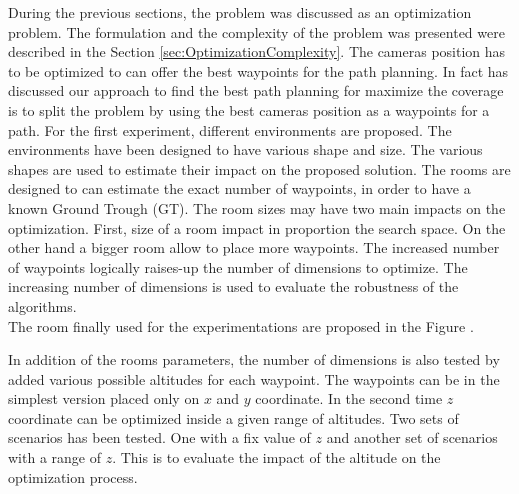  During the previous sections, the problem was discussed as an optimization problem. The formulation  and the complexity of the problem was presented were described in the Section \ref{sec:OptimizationComplexity}.
  The cameras position has to be optimized to can offer the best waypoints for the path planning. In fact has discussed  our approach to find the best path planning for maximize the coverage is to split the problem  by using the best cameras position as a waypoints for a path. 
For the first experiment, different environments are proposed. %
The environments have been designed to have various shape and size. The various shapes are used to estimate their impact  on the proposed solution.
The rooms are designed to can estimate the exact number of waypoints, in order to have a known  Ground Trough (GT).
 The room sizes  may have two main impacts on the optimization.
First, size of a room impact in proportion the search space. %
On the other hand a bigger room allow to place more waypoints. The increased  number of waypoints logically raises-up the number of dimensions to optimize. %
 The increasing number of dimensions is used to evaluate the robustness of the algorithms.\\
 The room finally used for the experimentations are proposed in the Figure .

 

 In addition of the rooms parameters, the number of dimensions is also tested by added various possible altitudes for each waypoint. The waypoints can be in the simplest version placed only on $x$ and $y$ coordinate. In the second time $z$ coordinate can be optimized inside a given range of altitudes. 
 Two sets of scenarios has been tested. One with a fix value of $z$ and another set of scenarios with a range of $z$.  This is to evaluate the impact of the altitude on the optimization process.



